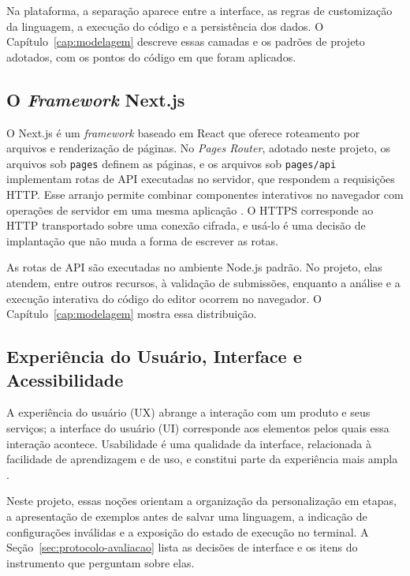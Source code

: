 Na plataforma, a separação aparece entre a interface, as regras de customização da linguagem, a execução do código e a persistência dos dados. O Capítulo~\ref{cap:modelagem} descreve essas camadas e os padrões de projeto adotados, com os pontos do código em que foram aplicados.

\subsection{O \textit{Framework} Next.js}

O Next.js é um \textit{framework} baseado em React que oferece roteamento por arquivos e renderização de páginas. No \textit{Pages Router}, adotado neste projeto, os arquivos sob \texttt{pages} definem as páginas, e os arquivos sob \texttt{pages/api} implementam rotas de API executadas no servidor, que respondem a requisições HTTP. Esse arranjo permite combinar componentes interativos no navegador com operações de servidor em uma mesma aplicação \cite{nextapi2026,nextpages2026}. O HTTPS corresponde ao HTTP transportado sobre uma conexão cifrada, e usá-lo é uma decisão de implantação que não muda a forma de escrever as rotas.

As rotas de API são executadas no ambiente Node.js padrão. No projeto, elas atendem, entre outros recursos, à validação de submissões, enquanto a análise e a execução interativa do código do editor ocorrem no navegador. O Capítulo~\ref{cap:modelagem} mostra essa distribuição.

\subsection{Experiência do Usuário, Interface e Acessibilidade}
\label{subsec:uxui}

A experiência do usuário (UX) abrange a interação com um produto e seus serviços; a interface do usuário (UI) corresponde aos elementos pelos quais essa interação acontece. Usabilidade é uma qualidade da interface, relacionada à facilidade de aprendizagem e de uso, e constitui parte da experiência mais ampla \cite{normannielsen1998}.

Neste projeto, essas noções orientam a organização da personalização em etapas, a apresentação de exemplos antes de salvar uma linguagem, a indicação de configurações inválidas e a exposição do estado de execução no terminal. A Seção~\ref{sec:protocolo-avaliacao} lista as decisões de interface e os itens do instrumento que perguntam sobre elas.

